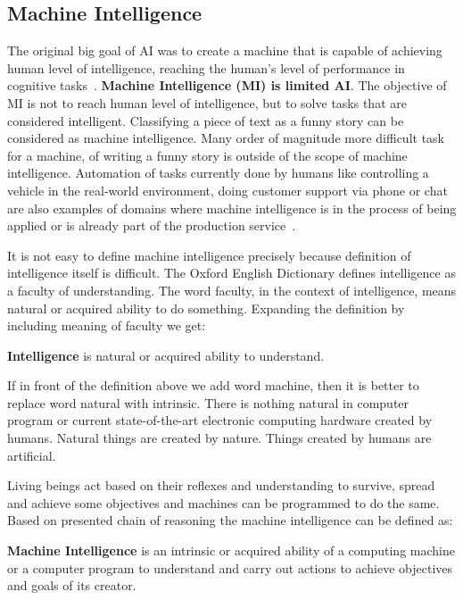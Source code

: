 \documentclass[english, 12pt, a4paper, elec, utf8, online]{aaltothesis}
\begin{document}
\subsection{Machine Intelligence}
The original big goal of AI was to create a machine that is capable of achieving human level of intelligence, reaching the human’s level of performance in cognitive tasks~\cite{Darwiche17}. \textbf{Machine Intelligence (MI) is limited AI}. The objective of MI is not to reach human level of intelligence, but to solve tasks that are considered intelligent. Classifying a piece of text as a funny story can be considered as machine intelligence. Many order of magnitude more difficult task for a machine, of writing a funny story is outside of the scope of machine intelligence. Automation of tasks currently done by humans like controlling a vehicle in the real-world environment, doing customer support via phone or chat are also examples of domains where machine intelligence is in the process of being applied or is already part of the production service~\cite{BojarskiCars16}. 

It is not easy to define machine intelligence precisely because definition of intelligence itself is difficult. The Oxford English Dictionary defines intelligence as a faculty of understanding. The word faculty, in the context of intelligence, means natural or acquired ability to do something. Expanding the definition by including meaning of faculty we get:

\begin{center}
\textbf{Intelligence} is natural or acquired ability to understand.
\end{center}

If in front of the definition above we add word machine, then it is better to replace word natural with intrinsic. There is nothing natural in computer program or current state-of-the-art electronic computing hardware created by humans. Natural things are created by nature. Things created by humans are artificial.    

Living beings act based on their reflexes and understanding to survive, spread and achieve some objectives and machines can be programmed to do the same. Based on presented chain of reasoning the machine intelligence can be defined as:

\begin{center}
\textbf{Machine Intelligence} is an intrinsic or acquired ability of a computing machine or a computer program to understand and carry out actions to achieve objectives and goals of its creator.
\end{center}
\end{document}
